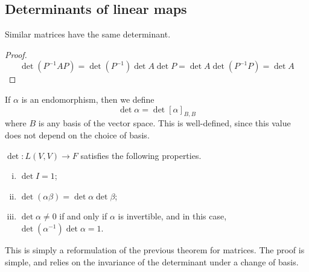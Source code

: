 \subsection{Determinants of linear maps}
\begin{lemma}
	Similar matrices have the same determinant.
\end{lemma}
\begin{proof}
	\[
		\det (P^{-1} A P) = \det(P^{-1}) \det A \det P = \det A \det (P^{-1} P) = \det A
	\]
\end{proof}
\begin{definition}
	If \( \alpha \) is an endomorphism, then we define
	\[
		\det \alpha = \det [\alpha]_{B, B}
	\]
	where \( B \) is any basis of the vector space.
	This is well-defined, since this value does not depend on the choice of basis.
\end{definition}
\begin{theorem}
	\( \det \colon L(V,V) \to F \) satisfies the following properties.
	\begin{enumerate}[(i)]
		\item \( \det I = 1 \);
		\item \( \det (\alpha\beta) = \det\alpha \det\beta \);
		\item \( \det \alpha \neq 0 \) if and only if \( \alpha \) is invertible, and in this case, \( \det(\alpha^{-1}) \det \alpha = 1 \).
	\end{enumerate}
	This is simply a reformulation of the previous theorem for matrices.
	The proof is simple, and relies on the invariance of the determinant under a change of basis.
\end{theorem}

